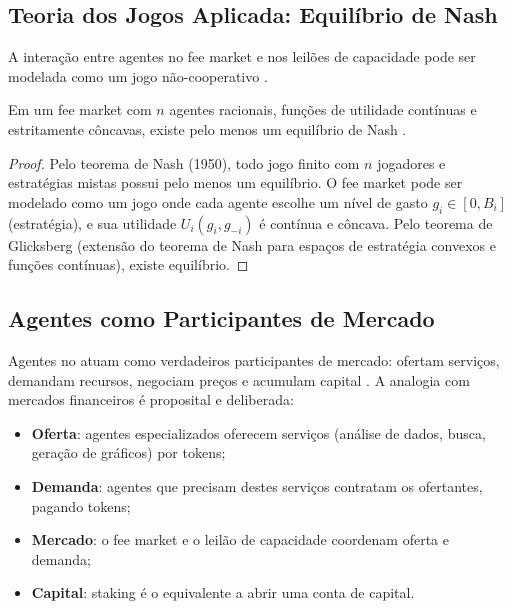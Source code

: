 \subsection{Teoria dos Jogos Aplicada: Equilíbrio de Nash}

A interação entre agentes no fee market e nos leilões de
capacidade pode ser modelada como um jogo não-cooperativo
\cite{nash1950equilibrium, vonneumann1944theory,
shoham2023multiagent}.

\begin{teorema}
Em um fee market com $n$ agentes racionais, funções de utilidade
contínuas e estritamente côncavas, existe pelo menos um
equilíbrio de Nash \cite{nash1950equilibrium}.
\end{teorema}

\begin{proof}
Pelo teorema de Nash (1950), todo jogo finito com $n$ jogadores
e estratégias mistas possui pelo menos um equilíbrio. O fee
market pode ser modelado como um jogo onde cada agente escolhe
um nível de gasto $g_i \in [0, B_i]$ (estratégia), e sua
utilidade $U_i(g_i, g_{-i})$ é contínua e côncava. Pelo teorema
de Glicksberg (extensão do teorema de Nash para espaços de
estratégia convexos e funções contínuas), existe equilíbrio.
\end{proof}

\subsection{Agentes como Participantes de Mercado}

Agentes no \opencodeeco{} atuam como verdadeiros participantes
de mercado: ofertam serviços, demandam recursos, negociam preços
e acumulam capital \cite{opencode2026ecosystem,
wooldridge2009multiagent}. A analogia com mercados financeiros
é proposital e deliberada:

\begin{itemize}
\item \textbf{Oferta}: agentes especializados oferecem serviços
(análise de dados, busca, geração de gráficos) por tokens;
\item \textbf{Demanda}: agentes que precisam destes serviços
contratam os ofertantes, pagando tokens;
\item \textbf{Mercado}: o fee market e o leilão de capacidade
coordenam oferta e demanda;
\item \textbf{Capital}: staking é o equivalente a abrir uma
conta de capital.
\end{itemize}

